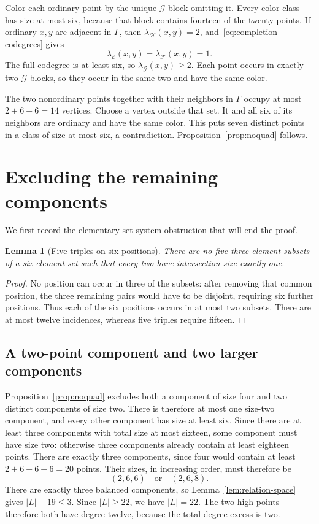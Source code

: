 \documentclass[11pt,letterpaper]{article}
\newtheorem{lemma}[theorem]{Lemma}
\theoremstyle{definition}\newtheorem{definition}[theorem]{Definition}
\theoremstyle{remark}\newtheorem{remark}[theorem]{Remark}
\newcommand{\calF}{\mathcal F}
\newcommand{\calH}{\mathcal H}
\newcommand{\calE}{\mathcal E}
\newcommand{\calG}{\mathcal G}
\newcommand{\lam}{\lambda}
\begin{document}
Color each ordinary point by the unique $\calG$-block omitting it. Every color class has size at most six, because that block contains fourteen of the twenty points. If ordinary $x,y$ are adjacent in $\Gamma$, then $\lam_{\calH}(x,y)=2$, and~\eqref{eq:completion-codegrees} gives
\[
 \lam_{\calE}(x,y)=\lam_{\calF}(x,y)=1.
\]
The full codegree is at least six, so $\lam_{\calG}(x,y)\ge2$. Each point occurs in exactly two $\calG$-blocks, so they occur in the same two and have the same color.

The two nonordinary points together with their neighbors in $\Gamma$ occupy at most $2+6+6=14$ vertices. Choose a vertex outside that set. It and all six of its neighbors are ordinary and have the same color. This puts seven distinct points in a class of size at most six, a contradiction. Proposition~\ref{prop:noquad} follows.

\section{Excluding the remaining components}\label{sec:remaining}
We first record the elementary set-system obstruction that will end the proof.

\begin{lemma}[Five triples on six positions]\label{lem:five-triples}
There are no five three-element subsets of a six-element set such that every two have intersection size exactly one.
\end{lemma}
\begin{proof}
No position can occur in three of the subsets: after removing that common position, the three remaining pairs would have to be disjoint, requiring six further positions. Thus each of the six positions occurs in at most two subsets. There are at most twelve incidences, whereas five triples require fifteen.
\end{proof}

\subsection{A two-point component and two larger components}
Proposition~\ref{prop:noquad} excludes both a component of size four and two distinct components of size two. There is therefore at most one size-two component, and every other component has size at least six. Since there are at least three components with total size at most sixteen, some component must have size two: otherwise three components already contain at least eighteen points. There are exactly three components, since four would contain at least $2+6+6+6=20$ points. Their sizes, in increasing order, must therefore be
\[
 (2,6,6)\quad\text{or}\quad(2,6,8).
\]
There are exactly three balanced components, so Lemma~\ref{lem:relation-space} gives $|L|-19\le3$. Since $|L|\ge22$, we have $|L|=22$. The two high points therefore both have degree twelve, because the total degree excess is two.
\end{document}
